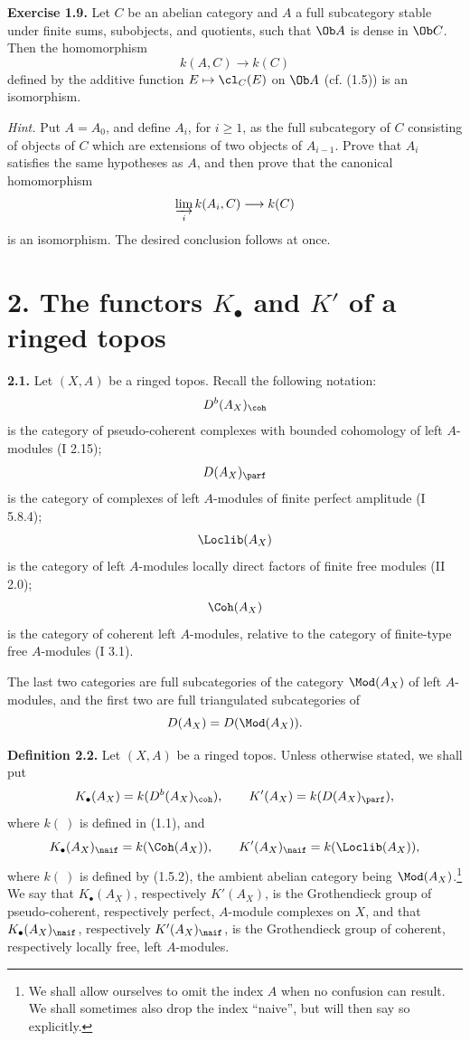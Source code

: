 \textbf{Exercise 1.9.} Let \(C\) be an abelian category and \(A\) a full subcategory stable under finite sums, subobjects, and quotients, such that \(\Ob A\) is dense in \(\Ob C\). Then the homomorphism
\[
 k(A,C)\longrightarrow k(C)
\]
defined by the additive function \(E\mapsto\cl_C(E)\) on \(\Ob A\) (cf. (1.5)) is an isomorphism.

\emph{Hint.} Put \(A=A_0\), and define \(A_i\), for \(i\geq1\), as the full subcategory of \(C\) consisting of objects of \(C\) which are extensions of two objects of \(A_{i-1}\). Prove that \(A_i\) satisfies the same hypotheses as \(A\), and then prove that the canonical homomorphism
\[
 \varinjlim_i k(A_i,C)\longrightarrow k(C)
\]
is an isomorphism. The desired conclusion follows at once.

\section*{2. The functors \(K_{\bullet}\) and \(K'\) of a ringed topos}

\textbf{2.1.} Let \((X,A)\) be a ringed topos. Recall the following notation:
\[
 D^b(A_X)_{\coh}
\]
is the category of pseudo-coherent complexes with bounded cohomology of left \(A\)-modules (I 2.15);
\[
 D(A_X)_{\parf}
\]
is the category of complexes of left \(A\)-modules of finite perfect amplitude (I 5.8.4);
\[
 \Loclib(A_X)
\]
is the category of left \(A\)-modules locally direct factors of finite free modules (II 2.0);
\[
 \Coh(A_X)
\]
is the category of coherent left \(A\)-modules, relative to the category of finite-type free \(A\)-modules (I 3.1).

The last two categories are full subcategories of the category \(\Mod(A_X)\) of left \(A\)-modules, and the first two are full triangulated subcategories of
\[
 D(A_X)=D(\Mod(A_X)).
\]

\textbf{Definition 2.2.} Let \((X,A)\) be a ringed topos. Unless otherwise stated, we shall put
\[
 K_{\bullet}(A_X)=k(D^b(A_X)_{\coh}),\qquad
 K'(A_X)=k(D(A_X)_{\parf}),
\]
where \(k(\ )\) is defined in (1.1), and
\[
 K_{\bullet}(A_X)_{\naif}=k(\Coh(A_X)),\qquad
 K'(A_X)_{\naif}=k(\Loclib(A_X)),
\]
where \(k(\ )\) is defined by (1.5.2), the ambient abelian category being \(\Mod(A_X)\).\footnote{We shall allow ourselves to omit the index \(A\) when no confusion can result. We shall sometimes also drop the index ``naive'', but will then say so explicitly.} We say that \(K_{\bullet}(A_X)\), respectively \(K'(A_X)\), is the Grothendieck group of pseudo-coherent, respectively perfect, \(A\)-module complexes on \(X\), and that \(K_{\bullet}(A_X)_{\naif}\), respectively \(K'(A_X)_{\naif}\), is the Grothendieck group of coherent, respectively locally free, left \(A\)-modules.

